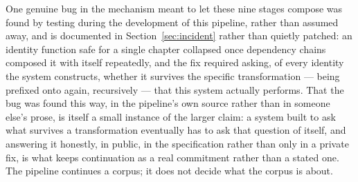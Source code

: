 \documentclass[11pt]{article}
\theoremstyle{definition}
\begin{document}
One genuine bug in the mechanism meant to let these nine stages compose
was found by testing during the development of this pipeline, rather
than assumed away, and is documented in Section~\ref{sec:incident}
rather than quietly patched: an identity function safe for a single
chapter collapsed once dependency chains composed it with itself
repeatedly, and the fix required asking, of every identity the system
constructs, whether it survives the specific transformation --- being
prefixed onto again, recursively --- that this system actually performs.
That the bug was found this way, in the pipeline's own source rather
than in someone else's prose, is itself a small instance of the larger
claim: a system built to ask what survives a transformation eventually
has to ask that question of itself, and answering it honestly, in
public, in the specification rather than only in a private fix, is what
keeps continuation as a real commitment rather than a stated one. The
pipeline continues a corpus; it does not decide what the corpus is
about.
\end{document}
